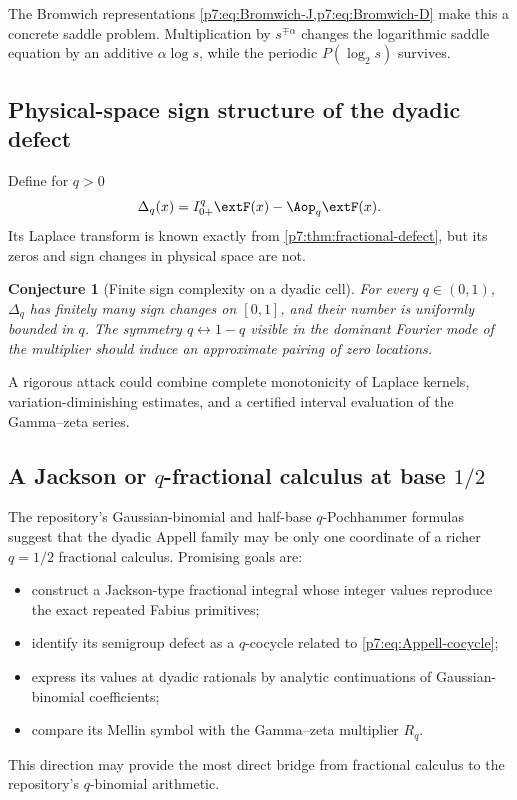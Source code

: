 \documentclass[11pt,oneside]{article}
\newtheorem{conjecture}[theorem]{Conjecture}
\theoremstyle{definition}
\theoremstyle{remark}
\newcommand{\1}{\mathbf 1}
\begin{document}
The Bromwich representations \cref{p7:eq:Bromwich-J,p7:eq:Bromwich-D} make this a concrete saddle
problem.  Multiplication by $s^{\mp\alpha}$ changes the logarithmic saddle equation by an
additive $\alpha\log s$, while the periodic $P(\log_2s)$ survives.

\subsection{Physical-space sign structure of the dyadic defect}

Define for $q>0$
\begin{equation}
 \Delta_q(x)=I_{0+}^{q}\extF(x)-\Aop_q\extF(x).
 \label{p7:eq:physical-defect}
\end{equation}
Its Laplace transform is known exactly from \cref{p7:thm:fractional-defect}, but its zeros and
sign changes in physical space are not.

\begin{conjecture}[Finite sign complexity on a dyadic cell]
For every $q\in(0,1)$, $\Delta_q$ has finitely many sign changes on $[0,1]$, and their number
is uniformly bounded in $q$.  The symmetry $q\leftrightarrow1-q$ visible in the dominant
Fourier mode of the multiplier should induce an approximate pairing of zero locations.
\statusopen
\end{conjecture}

A rigorous attack could combine complete monotonicity of Laplace kernels, variation-diminishing
estimates, and a certified interval evaluation of the Gamma--zeta series.

\subsection{A Jackson or $q$-fractional calculus at base $1/2$}

The repository's Gaussian-binomial and half-base $q$-Pochhammer formulas suggest that the
dyadic Appell family may be only one coordinate of a richer $q=1/2$ fractional calculus.
Promising goals are:
\begin{itemize}
\item construct a Jackson-type fractional integral whose integer values reproduce the exact
      repeated Fabius primitives;
\item identify its semigroup defect as a $q$-cocycle related to \cref{p7:eq:Appell-cocycle};
\item express its values at dyadic rationals by analytic continuations of Gaussian-binomial
      coefficients;
\item compare its Mellin symbol with the Gamma--zeta multiplier $R_q$.
\end{itemize}
This direction may provide the most direct bridge from fractional calculus to the repository's
$q$-binomial arithmetic.
\end{document}

